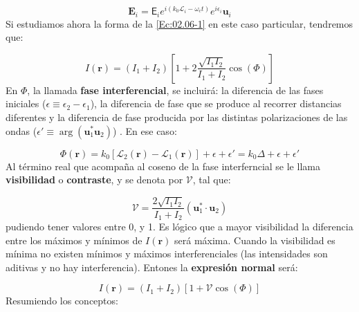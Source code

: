 \documentclass[12pt,a4paper]{book}
\numberwithin{equation}{section}
\numberwithin{figure}{section}
\newcommand{\parentesis}[1]{\left( #1  \right)}
\newcommand{\ccorchetes}[1]{\left[ #1  \right]}
\newcommand{\1}{_{(1)}}
\newcommand{\2}{_{(2)}}
\newcommand{\un}{\mathbf{u}}
\newcommand{\rn}{\mathbf{r}}
\newcommand{\En}{\mathbf{E}}
\theoremstyle{definition}
\begin{document}
\begin{equation}
\En_i = \mathsf{E}_i e^{i(k_0 \mathcal{L}_i - \omega_c t)} e^{i \epsilon_i} \un_i
\end{equation}
Si estudiamos ahora la forma de la \ref{Ec:02.06-1} en este caso particular, tendremos que:

\begin{equation}
I(\rn) = \parentesis{I_1+I_2}\ccorchetes{1+2\frac{\sqrt{I_1 I_2}}{I_1+I_2} \cos (\Phi)}
\end{equation}
En $\Phi$, la llamada \textbf{fase interferencial}, se incluirá: la diferencia de las fases iniciales ($\epsilon \equiv \epsilon_2 - \epsilon_1$), la diferencia de fase que se produce al recorrer distancias diferentes y la diferencia de fase producida por las distintas polarizaciones de las ondas ($\epsilon'\equiv \arg (\un_1^* \un_2)$) . En ese caso:

\begin{equation}
\Phi (\rn) = k_0 [\mathcal{L}_2 (\rn) - \mathcal{L}_1 (\rn)] + \epsilon + \epsilon' =  k_0  \Delta + \epsilon + \epsilon'  \label{Ec:02.05-01-Fase}
\end{equation}
Al término real que acompaña al coseno de la fase interferncial se le llama \textbf{visibilidad} o \textbf{contraste}, y se denota por $\mathcal{V}$, tal que:

\begin{equation}
\mathcal{V} = \frac{2 \sqrt{I_1 I_2} }{I_1 + I_2} (\un_1^* \cdot \un_2) \label{Ec:02.05-02-Visibilidad}
\end{equation}
pudiendo tener valores entre 0, y 1. Es lógico que a mayor visibilidad la diferencia entre los máximos y mínimos de $I(\rn)$ será máxima. Cuando la visibilidad es mínima no existen mínimos y máximos interferenciales (las intensidades son aditivas y no hay interferencia). Entones la \textbf{expresión normal} será:

\begin{equation}
I(\rn) = (I_1 + I_2) \ccorchetes{ 1 + \mathcal{V} \cos (\Phi)}
\end{equation}
Resumiendo los conceptos:
\end{document}
